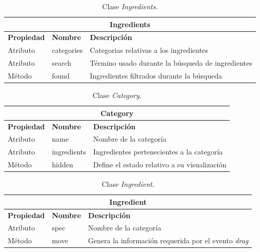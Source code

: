 \begin{table}[H]
    \begin{center}
        \begin{tabularx}{\textwidth}{| l | l | X |}
            \hline
            \multicolumn{3}{c}{ \textbf{Ingredients} } \\ \hline
            \textbf{Propiedad} & \textbf{Nombre} & \textbf{Descripción} \\ \hline
            Atributo & categories & Categorias relativas a los ingredientes \\ \hline
            Atributo & search & Término usado durante la búsqueda de ingredientes \\ \hline
            Método & found & Ingredientes filtrados durante la búsqueda \\ \hline
        \end{tabularx}
    \end{center}
    \caption{Clase \textit{Ingredients}.}
    \label{tab:classIngredients}
\end{table}

\begin{table}[H]
    \begin{center}
        \begin{tabularx}{\textwidth}{| l | l | X |}
            \hline
            \multicolumn{3}{c}{ \textbf{Category} } \\ \hline
            \textbf{Propiedad} & \textbf{Nombre} & \textbf{Descripción} \\ \hline
            Atributo & name & Nombre de la categoría \\ \hline
            Atributo & ingredients & Ingredientes pertenecientes a la categoría \\ \hline
            Método & hidden & Define el estado relativo a su visualización \\ \hline
        \end{tabularx}
    \end{center}
    \caption{Clase \textit{Category}.}
    \label{tab:classCategory}
\end{table}

\begin{table}[H]
    \begin{center}
        \begin{tabularx}{\textwidth}{| l | l | X |}
            \hline
            \multicolumn{3}{c}{ \textbf{Ingredient} } \\ \hline
            \textbf{Propiedad} & \textbf{Nombre} & \textbf{Descripción} \\ \hline
            Atributo & spec & Nombre de la categoría \\ \hline
            Método & move & Genera la información requerida por el evento \textit{drag}  \\ \hline
        \end{tabularx}
    \end{center}
    \caption{Clase \textit{Ingredient}.}
    \label{tab:classIngredient}
\end{table}

